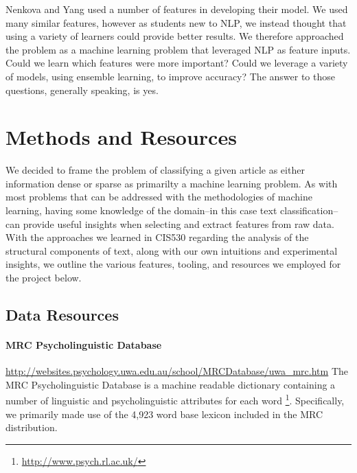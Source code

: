 \documentclass[
10pt, %
a4paper, %
oneside, %
headinclude,footinclude, %
BCOR5mm, %
]{scrartcl}
\begin{document}
Nenkova and Yang used a number of features in developing their model. We used
many similar features, however as students new to NLP, we instead thought that
using a variety of learners could provide better results. We therefore
approached the problem as a machine learning problem that leveraged NLP as
feature inputs. Could we learn which features were more important? Could we
leverage a variety of models, using ensemble learning, to improve accuracy? The
answer to those questions, generally speaking, is yes.

\newpage
 

\section{Methods and Resources}

We decided to frame the problem of classifying a given article as either 
information dense or sparse as primarilty a machine learning problem. As with
most problems that can be addressed with the methodologies of machine learning,
having some knowledge of the domain--in this case text classification--can 
provide useful insights when selecting and extract features from raw data. With 
the approaches we learned in CIS530 regarding the analysis of the structural
components of text, along with our own intuitions and experimental 
insights, we outline the various features, tooling, and resources we employed 
for the project below.

\subsection{Data Resources}

\paragraph{\textbf{MRC Psycholinguistic Database}}
\hfill \newline \noindent \url{http://websites.psychology.uwa.edu.au/school/MRCDatabase/uwa_mrc.htm}
\hfill \newline \noindent The MRC Psycholinguistic Database is a machine readable
dictionary containing a number of linguistic and psycholinguistic
attributes for each word \footnote{\url{http://www.psych.rl.ac.uk/}}. 
Specifically, we primarily made use of the 4,923 word base lexicon included in 
the MRC distribution.
\end{document}
